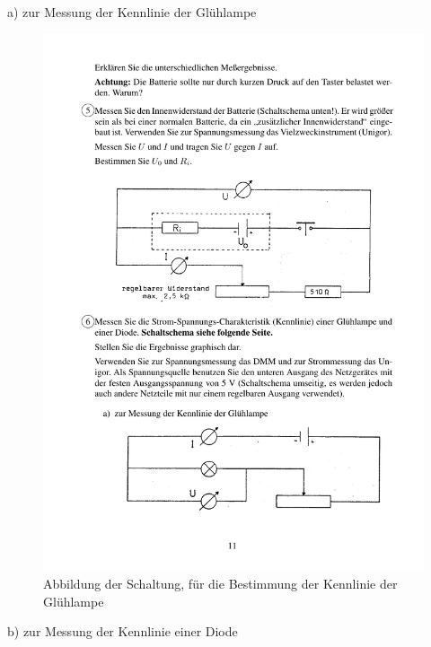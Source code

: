\documentclass[12pt]{scrartcl}
\begin{document}
\begin{enumerate}
	a) zur Messung der Kennlinie der 				Glühlampe
	
	\begin{figure}[htbp] 
	  \centering
	    \includegraphics[trim = 18mm 15mm 1mm 151mm, clip, scale = 1]{abb_versuch_5_6a.pdf}
	  	\caption[Abbildung der Schaltung, für die Bestimmung der Kennlinie der Glühlampe]{Abbildung der Schaltung, für die Bestimmung der Kennlinie der Glühlampe\footnotemark}
	  \label{fig:abb_versuch_6a}
	\end{figure}
	\newpage
	b) zur Messung der Kennlinie einer Diode
	

\end{enumerate}
\end{document}
